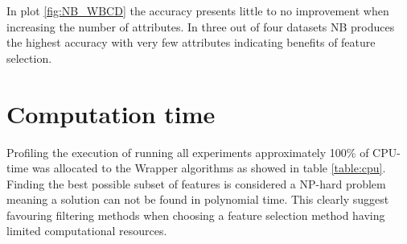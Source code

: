 In plot \ref{fig:NB_WBCD} the accuracy presents little to no improvement when increasing the number of attributes. In three out of four datasets NB produces the highest accuracy with very few attributes indicating benefits of feature selection.






\newpage
\section{Computation time}
\label{sec:cumtime}

Profiling the execution of running all experiments approximately 100\% of CPU-time was allocated to the Wrapper algorithms as showed in table \ref{table:cpu}. Finding the best possible subset of features is considered a NP-hard problem meaning a solution can not be found in polynomial time. This clearly suggest favouring filtering methods when choosing a feature selection method having limited computational resources.


